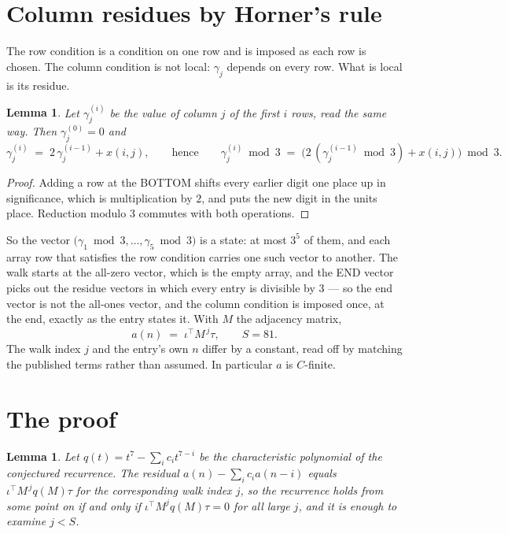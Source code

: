 \documentclass[11pt,a4paper]{article}
\theoremstyle{plain}
\newtheorem{lemma}[theorem]{Lemma}
\theoremstyle{definition}
\begin{document}
\section{Column residues by Horner's rule}

The row condition is a condition on one row and is imposed as each row is chosen. The column
condition is not local: $\gamma_j$ depends on every row. What is local is its residue.

\begin{lemma}\label{lem:horner}
Let $\gamma_j^{(i)}$ be the value of column $j$ of the first $i$ rows, read the same way.
Then $\gamma_j^{(0)}=0$ and
\[
\gamma_j^{(i)}\;=\;2\,\gamma_j^{(i-1)}+x(i,j),
\qquad\text{hence}\qquad
\gamma_j^{(i)}\bmod 3\;=\;
\bigl(2\,(\gamma_j^{(i-1)}\bmod 3)+x(i,j)\bigr)\bmod 3 .
\]
\end{lemma}

\begin{proof}
Adding a row at the BOTTOM shifts every earlier digit one place up in significance, which is
multiplication by $2$, and puts the new digit in the units place. Reduction modulo
$3$ commutes with both operations.
\end{proof}

So the vector $\bigl(\gamma_1\bmod 3,\dots,\gamma_{5}\bmod
3\bigr)$ is a state: at most $3^{5}$ of them, and each array row
that satisfies the row condition carries one such vector to another. The walk starts at the
all-zero vector, which is the empty array, and the END vector picks out the residue vectors in
which every entry is divisible by $3$ --- so the end vector is not the all-ones
vector, and the column condition is imposed once, at the end, exactly as the entry states it.
With $M$ the adjacency matrix,
\[
a(n)\;=\;\iota^{\!\top}M^{\,j}\tau ,\qquad S=81.
\]
The walk index $j$ and the entry's own $n$ differ by a constant, read off by matching the
published terms rather than assumed. In particular $a$ is $C$-finite.

\section{The proof}

\begin{lemma}\label{lem:crit}
Let $q(t)=t^{7}-\sum_i c_it^{7-i}$ be the characteristic polynomial of the
conjectured recurrence. The residual $a(n)-\sum_ic_ia(n-i)$ equals
$\iota^{\!\top}M^{\,j}q(M)\tau$ for the corresponding walk index $j$, so the recurrence
holds from some point on if and only if $\iota^{\!\top}M^{j}q(M)\tau=0$ for all large $j$,
and it is enough to examine $j<S$.
\end{lemma}
\end{document}
